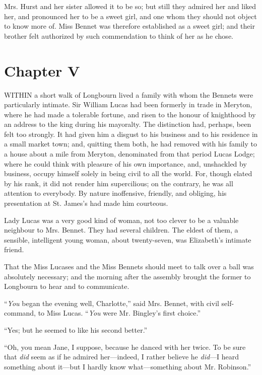 \documentclass[12pt,openright]{book}
\begin{document}
Mrs. Hurst and her sister allowed it to be so; but still they admired her and liked her, and pronounced her to be a sweet girl, and one whom they should not object to know more of. Miss Bennet was therefore established as a sweet girl; and their brother felt authorized by such commendation to think of her as he chose.

\chapter{Chapter V}

\noindent  WITHIN a short walk of Longbourn lived a family with whom the Bennets were particularly intimate. Sir William Lucas had been formerly in trade in Meryton, where he had made a tolerable fortune, and risen to the honour of knighthood by an address to the king during his mayoralty. The distinction had, perhaps, been felt too strongly. It had given him a disgust to his business and to his residence in a small market town; and, quitting them both, he had removed with his family to a house about a mile from Meryton, denominated from that period Lucas Lodge; where he could think with pleasure of his own importance, and, unshackled by business, occupy himself solely in being civil to all the world. For, though elated by his rank, it did not render him supercilious; on the contrary, he was all attention to everybody. By nature inoffensive, friendly, and obliging, his presentation at St. James’s had made him courteous.

Lady Lucas was a very good kind of woman, not too clever to be a valuable neighbour to Mrs. Bennet. They had several children. The eldest of them, a sensible, intelligent young woman, about twenty-seven, was Elizabeth’s intimate friend.

That the Miss Lucases and the Miss Bennets should meet to talk over a ball was absolutely necessary; and the morning after the assembly brought the former to Longbourn to hear and to communicate.

“\textit{You} began the evening well, Charlotte,” said Mrs. Bennet, with civil self-command, to Miss Lucas. “\textit{You} were Mr. Bingley’s first choice.”

“Yes; but he seemed to like his second better.”

“Oh, you mean Jane, I suppose, because he danced with her twice. To be sure that \textit{did} seem as if he admired her—indeed, I rather believe he \textit{did}—I heard something about it—but I hardly know what—something about Mr. Robinson.”
\end{document}

